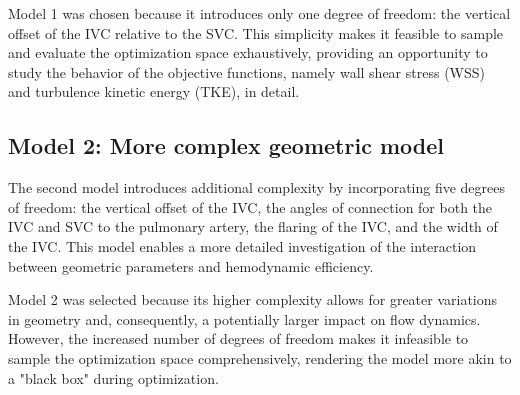 Model 1 was chosen because it introduces only one degree of freedom: the vertical offset of the IVC relative to the SVC. This simplicity makes it feasible to sample and evaluate the optimization space exhaustively, providing an opportunity to study the behavior of the objective functions, namely wall shear stress (WSS) and turbulence kinetic energy (TKE), in detail.

\subsection*{Model 2: More complex geometric model}
The second model introduces additional complexity by incorporating five degrees of freedom: the vertical offset of the IVC, the angles of connection for both the IVC and SVC to the pulmonary artery, the flaring of the IVC, and the width of the IVC. This model enables a more detailed investigation of the interaction between geometric parameters and hemodynamic efficiency.

Model 2 was selected because its higher complexity allows for greater variations in geometry and, consequently, a potentially larger impact on flow dynamics. However, the increased number of degrees of freedom makes it infeasible to sample the optimization space comprehensively, rendering the model more akin to a "black box" during optimization.

